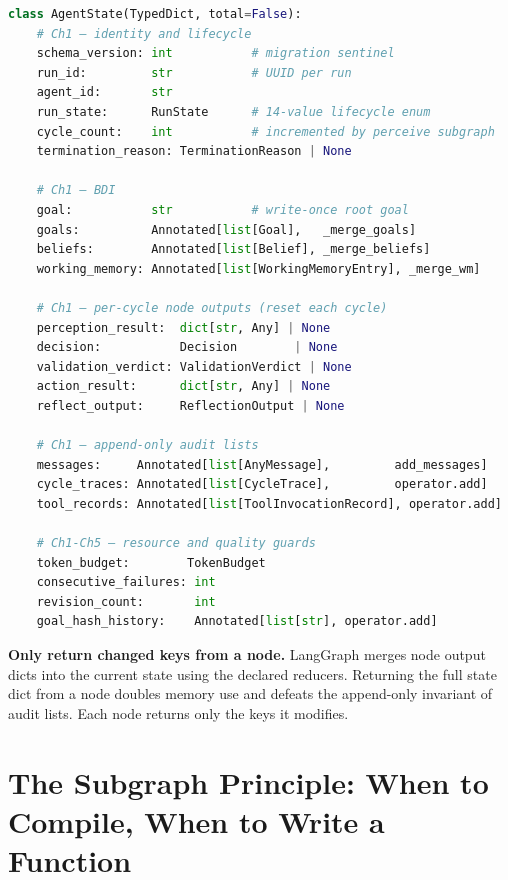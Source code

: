 \begin{lstlisting}[language=Python,
    caption={AgentState TypedDict — canonical schema (src/state.py, excerpt)},
    label={lst:agent-state}]
class AgentState(TypedDict, total=False):
    # Ch1 — identity and lifecycle
    schema_version: int           # migration sentinel
    run_id:         str           # UUID per run
    agent_id:       str
    run_state:      RunState      # 14-value lifecycle enum
    cycle_count:    int           # incremented by perceive subgraph
    termination_reason: TerminationReason | None

    # Ch1 — BDI
    goal:           str           # write-once root goal
    goals:          Annotated[list[Goal],   _merge_goals]
    beliefs:        Annotated[list[Belief], _merge_beliefs]
    working_memory: Annotated[list[WorkingMemoryEntry], _merge_wm]

    # Ch1 — per-cycle node outputs (reset each cycle)
    perception_result:  dict[str, Any] | None
    decision:           Decision        | None
    validation_verdict: ValidationVerdict | None
    action_result:      dict[str, Any] | None
    reflect_output:     ReflectionOutput | None

    # Ch1 — append-only audit lists
    messages:     Annotated[list[AnyMessage],         add_messages]
    cycle_traces: Annotated[list[CycleTrace],         operator.add]
    tool_records: Annotated[list[ToolInvocationRecord], operator.add]

    # Ch1-Ch5 — resource and quality guards
    token_budget:        TokenBudget
    consecutive_failures: int
    revision_count:       int
    goal_hash_history:    Annotated[list[str], operator.add]
\end{lstlisting}

\begin{tipbox}
\textbf{Only return changed keys from a node.}  LangGraph merges node
output dicts into the current state using the declared reducers.
Returning the full state dict from a node doubles memory use and defeats
the append-only invariant of audit lists.  Each node returns only the
keys it modifies.
\end{tipbox}

\section{The Subgraph Principle: When to Compile, When to Write a Function}
\label{sec:subgraph-principle}

